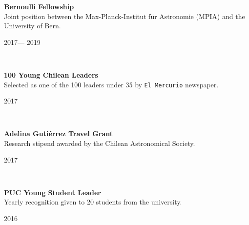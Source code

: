 \documentclass[12pt, a4paper]{article} %
\begin{document}
\begin{minipage}[t]{0.7\textwidth}
\begin{flushleft}%
  \setlength{\leftskip}{0.2cm}%
\textbf{Bernoulli Fellowship}\\
Joint position between the Max-Planck-Institut f\"ur Astronomie (MPIA) and the University of Bern.
\end{flushleft}
\end{minipage}
\begin{minipage}[t]{0.3\textwidth}
\hfill 2017--- 2019
\end{minipage}\\

\begin{minipage}[t]{0.7\textwidth}
\begin{flushleft}%
  \setlength{\leftskip}{0.2cm}%
\textbf{100 Young Chilean Leaders}\\
Selected as one of the 100 leaders under 35 by \texttt{El Mercurio} newspaper.
\end{flushleft}
\end{minipage}
\begin{minipage}[t]{0.3\textwidth}
\hfill 2017
\end{minipage}\\

\begin{minipage}[t]{0.7\textwidth}
\begin{flushleft}%
  \setlength{\leftskip}{0.2cm}%
\textbf{Adelina Guti\'errez Travel Grant}\\
Research stipend awarded by the Chilean Astronomical Society.
\end{flushleft}
\end{minipage}
\begin{minipage}[t]{0.3\textwidth}
\hfill 2017
\end{minipage}\\

\begin{minipage}[t]{0.7\textwidth}
\begin{flushleft}%
  \setlength{\leftskip}{0.2cm}%
\textbf{PUC Young Student Leader}\\
Yearly recognition given to 20 students from the university.
\end{flushleft}
\end{minipage}
\begin{minipage}[t]{0.3\textwidth}
\hfill 2016
\end{minipage}\\
\end{document}
